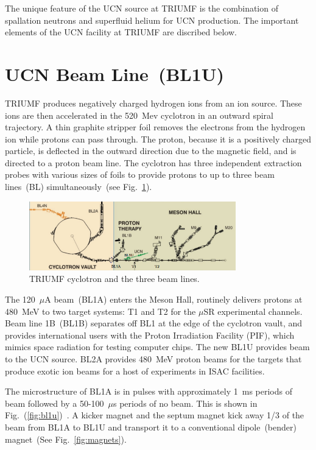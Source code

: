 The unique feature of the UCN source at TRIUMF is the combination of
spallation neutrons and superfluid helium for UCN production. The
important elements of the UCN facility at TRIUMF are discribed below.


\section{UCN Beam Line~(BL1U)}
TRIUMF produces negatively charged hydrogen ions from an ion
source. These ions are then accelerated in the 520~Mev cyclotron in an
outward spiral trajectory. A thin graphite stripper foil removes the
electrons from the hydrogen ion while protons can pass through. The
proton, because it is a positively charged particle, is deflected in
the outward direction due to the magnetic field, and is directed to a
proton beam line. The cyclotron has three independent extraction
probes with various sizes of foils to provide protons to up to three
beam lines~(BL) simultaneously~(see Fig.~\ref{fig:cyclotron}).

\begin{figure}[h!]
  \centering
  \includegraphics[width=0.8\textwidth]{cyclotron.png}
  \caption{TRIUMF cyclotron and the three beam lines.}
  \label{fig:cyclotron}
\end{figure}


The 120~$\mu$A beam~(BL1A) enters the Meson Hall, routinely delivers
protons at 480~MeV to two target systems: T1 and T2 for the $\mu$SR
experimental channels. Beam line 1B~(BL1B) separates off BL1 at the
edge of the cyclotron vault, and provides international users with the
Proton Irradiation Facility (PIF), which mimics space radiation for
testing computer chips. The new BL1U provides beam to the UCN
source. BL2A provides 480~MeV proton beams for the targets that
produce exotic ion beams for a host of experiments in ISAC facilities.

The microstructure of BL1A is in pulses with approximately 1~ms
periods of beam followed by a 50-100~$\mu$s periods of no beam.  This
is shown in Fig.~(\ref{fig:bl1u})~\cite{Nick_thesis}.  A kicker magnet
and the septum magnet kick away 1/3 of the beam from BL1A to BL1U and
transport it to a conventional dipole~(bender) magnet~(See
Fig.~\ref{fig:magnets}).

